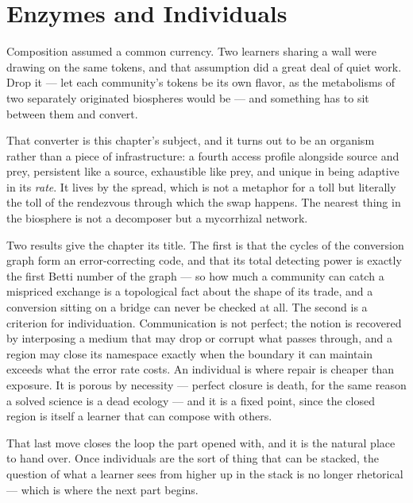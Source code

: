 \chapter{Enzymes and Individuals}
\label{ch:eng}

\noindent
Composition assumed a common currency. Two learners sharing a wall were
drawing on the same tokens, and that assumption did a great deal of quiet
work. Drop it --- let each community's tokens be its own flavor, as the
metabolisms of two separately originated biospheres would be --- and
something has to sit between them and convert.

That converter is this chapter's subject, and it turns out to be an organism
rather than a piece of infrastructure: a fourth access profile alongside
source and prey, persistent like a source, exhaustible like prey, and unique
in being adaptive in its \emph{rate}. It lives by the spread, which is not a
metaphor for a toll but literally the toll of the rendezvous through which
the swap happens. The nearest thing in the biosphere is not a decomposer but
a mycorrhizal network.

Two results give the chapter its title. The first is that the cycles of the
conversion graph form an error-correcting code, and that its total detecting
power is exactly the first Betti number of the graph --- so how much a
community can catch a mispriced exchange is a topological fact about the
shape of its trade, and a conversion sitting on a bridge can never be
checked at all. The second is a criterion for individuation. Communication
is not perfect; the notion is recovered by interposing a medium that may
drop or corrupt what passes through, and a region may close its namespace
exactly when the boundary it can maintain exceeds what the error rate costs.
An individual is where repair is cheaper than exposure. It is porous by
necessity --- perfect closure is death, for the same reason a solved science
is a dead ecology --- and it is a fixed point, since the closed region is
itself a learner that can compose with others.

That last move closes the loop the part opened with, and it is the natural
place to hand over. Once individuals are the sort of thing that can be
stacked, the question of what a learner sees from higher up in the stack is
no longer rhetorical --- which is where the next part begins.

